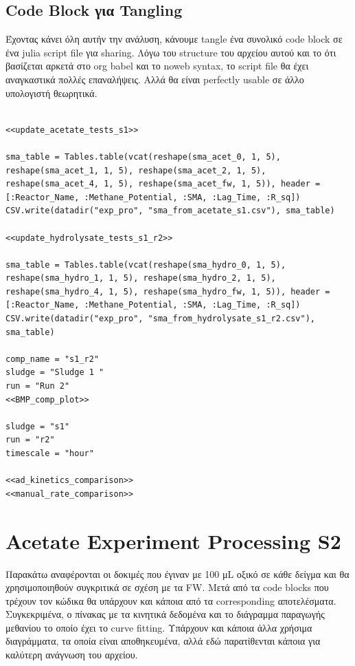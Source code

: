\documentclass[11pt]{article}
\begin{document}
\subsection{Code Block για Tangling}
\label{sec:org4b4db4e}
Έχοντας κάνει όλη αυτήν την ανάλυση, κάνουμε tangle ένα συνολικό code block σε ένα julia script file για sharing. Λόγω του structure του αρχείου αυτού και το ότι βασίζεται αρκετά στο org babel και το noweb syntax, το script file θα έχει αναγκαστικά πολλές επαναλήψεις. Αλλά θα είναι perfectly usable σε άλλο υπολογιστή θεωρητικά.

\begin{verbatim}

<<update_acetate_tests_s1>>

sma_table = Tables.table(vcat(reshape(sma_acet_0, 1, 5), reshape(sma_acet_1, 1, 5), reshape(sma_acet_2, 1, 5), reshape(sma_acet_4, 1, 5), reshape(sma_acet_fw, 1, 5)), header = [:Reactor_Name, :Methane_Potential, :SMA, :Lag_Time, :R_sq])
CSV.write(datadir("exp_pro", "sma_from_acetate_s1.csv"), sma_table)

<<update_hydrolysate_tests_s1_r2>>

sma_table = Tables.table(vcat(reshape(sma_hydro_0, 1, 5), reshape(sma_hydro_1, 1, 5), reshape(sma_hydro_2, 1, 5), reshape(sma_hydro_4, 1, 5), reshape(sma_hydro_fw, 1, 5)), header = [:Reactor_Name, :Methane_Potential, :SMA, :Lag_Time, :R_sq])
CSV.write(datadir("exp_pro", "sma_from_hydrolysate_s1_r2.csv"), sma_table)

comp_name = "s1_r2"
sludge = "Sludge 1 "
run = "Run 2"
<<BMP_comp_plot>>

sludge = "s1"
run = "r2"
timescale = "hour"

<<ad_kinetics_comparison>>
<<manual_rate_comparison>>
\end{verbatim}

\section{Acetate Experiment Processing S2}
\label{sec:orgb660b2f}
Παρακάτω αναφέρονται οι δοκιμές που έγιναν με 100 μL οξικό σε κάθε δείγμα και θα χρησιμοποιηθούν συγκριτικά σε σχέση με τα FW. Μετά από τα code blocks που τρέχουν τον κώδικα θα υπάρχουν και κάποια από τα corresponding αποτελέσματα. Συγκεκριμένα, ο πίνακας με τα κινητικά δεδομένα και το διάγραμμα παραγωγής μεθανίου το οποίο έχει το curve fitting. Υπάρχουν και κάποια άλλα χρήσιμα διαγράμματα, τα οποία είναι αποθηκευμένα, αλλά εδώ παρατίθενται κάποια για καλύτερη ανάγνωση του αρχείου.
\end{document}
